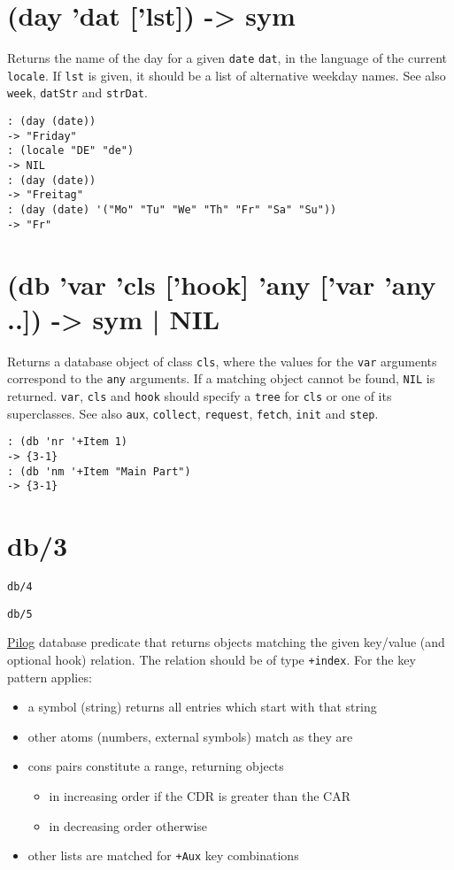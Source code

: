 {{ 
\section{(day 'dat ['lst]) -> sym}
\label{sec-8-1-4-12}


Returns the name of the day for a given \texttt{date} \texttt{dat}, in the language of
the current \texttt{locale}. If \texttt{lst} is given, it should be a list of
alternative weekday names. See also \texttt{week}, \texttt{datStr} and \texttt{strDat}.


\begin{verbatim}
: (day (date))
-> "Friday"
: (locale "DE" "de")
-> NIL
: (day (date))
-> "Freitag"
: (day (date) '("Mo" "Tu" "We" "Th" "Fr" "Sa" "Su"))
-> "Fr"
\end{verbatim}

 
\section{(db 'var 'cls ['hook] 'any ['var 'any ..]) -> sym | NIL}
\label{sec-8-1-4-13}


Returns a database object of class \texttt{cls}, where the values for the \texttt{var}
arguments correspond to the \texttt{any} arguments. If a matching object cannot
be found, \texttt{NIL} is returned. \texttt{var}, \texttt{cls} and \texttt{hook} should specify a
\texttt{tree} for \texttt{cls} or one of its superclasses. See also \texttt{aux}, \texttt{collect},
\texttt{request}, \texttt{fetch}, \texttt{init} and \texttt{step}.


\begin{verbatim}
: (db 'nr '+Item 1)
-> {3-1}
: (db 'nm '+Item "Main Part")
-> {3-1}
\end{verbatim}

 
\section{db/3}
\label{sec-8-1-4-14}


\texttt{db/4}

\texttt{db/5}

\hyperref[ref.html-pilog]{Pilog} database predicate that returns objects
matching the given key/value (and optional hook) relation. The relation
should be of type \texttt{+index}. For the key pattern applies:

\begin{itemize}
\item a symbol (string) returns all entries which start with that string
\item other atoms (numbers, external symbols) match as they are
\item cons pairs constitute a range, returning objects
\begin{itemize}
\item in increasing order if the CDR is greater than the CAR
\item in decreasing order otherwise
\end{itemize}
\item other lists are matched for \texttt{+Aux} key combinations
\end{itemize}

}}
